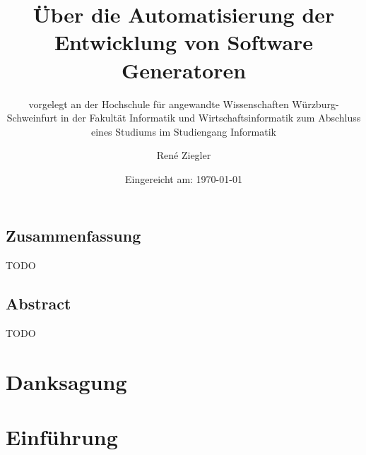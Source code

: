 \documentclass[12pt,oneside,a4paper,parskip]{scrbook}
\def\BaAuthor{René Ziegler}
\def\BaTitle{Über die Automatisierung der Entwicklung von Software Generatoren}
\def\BaSupervisorOne{Prof.\ Dr.\ Peter Braun}
\def\BaSupervisorTwo{M.Sc. Tobias Fertig}
\def\BaDeadline{\today}
\begin{document}


\frontmatter
\titlehead{%
  {Hochschule für angewandte Wissenschaften Würzburg-Schweinfurt\\
   Fakultät Informatik und Wirtschaftsinformatik}}
\subject{Bachelorarbeit}
\title{\BaTitle\\[15mm]}
\subtitle{\normalsize{vorgelegt an der Hochschule f\"{u}r angewandte Wissenschaften W\"{u}rzburg-Schweinfurt in der Fakult\"{a}t Informatik und Wirtschaftsinformatik zum Abschluss eines Studiums im Studiengang Informatik}}
\author{\BaAuthor}
\date{\normalsize{Eingereicht am: \BaDeadline}}
\publishers{
  \normalsize{Erstpr\"{u}fer: \BaSupervisorOne}\\
  \normalsize{Zweitpr\"{u}fer: \BaSupervisorTwo}\\
}


\maketitle



\section*{Zusammenfassung}

TODO

\section*{Abstract}

TODO

\newpage
\chapter*{Danksagung}



\tableofcontents



\mainmatter


\chapter{Einführung}\label{ch:intro}
\end{document}
